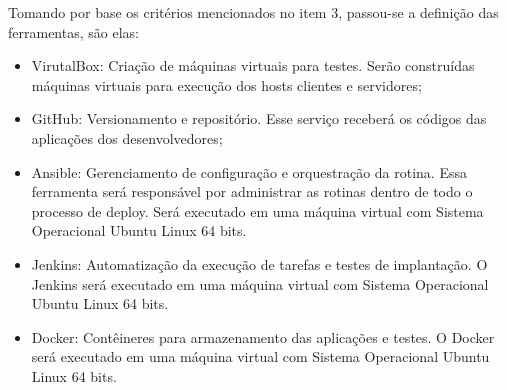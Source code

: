 Tomando por base os critérios mencionados no item 3, passou-se a definição das ferramentas, são elas:

\begin{itemize}
	
\item VirutalBox: Criação de máquinas virtuais para testes. Serão construídas máquinas virtuais para execução dos hosts clientes e servidores;
\item GitHub: Versionamento e repositório. Esse serviço receberá os códigos das aplicações dos desenvolvedores;
\item Ansible: Gerenciamento de configuração e orquestração da rotina. Essa ferramenta será responsável por administrar as rotinas dentro de todo o processo de deploy. Será executado em uma máquina virtual com Sistema Operacional Ubuntu Linux 64 bits.
\item Jenkins: Automatização da execução de tarefas e testes de implantação. O Jenkins será executado em uma máquina virtual com Sistema Operacional Ubuntu Linux 64 bits.
\item Docker: Contêineres para armazenamento das aplicações e testes. O Docker será executado em uma máquina virtual com Sistema Operacional Ubuntu Linux 64 bits.

\end{itemize}




